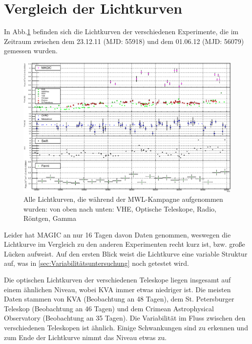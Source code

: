 \section{Vergleich der Lichtkurven}
In Abb.\ref{LC_MWL} befinden sich die Lichtkurven der verschiedenen Experimente, die im Zeitraum zwischen dem 23.12.11 (MJD: 55918) und dem 01.06.12 (MJD: 56079) gemessen wurden.

\begin{figure}
    \centering
    \includegraphics[width=1\linewidth]{./Plots/05_MWL/LC_final.pdf}
    \caption{Alle Lichtkurven, die während der MWL-Kampagne aufgenommen wurden: von oben nach unten: VHE, Optische Teleskope, Radio, Röntgen, Gamma}
    \label{LC_MWL}
\end{figure}

Leider hat MAGIC an nur 16 Tagen davon Daten genommen, weswegen die Lichtkurve im Vergleich zu den anderen Experimenten recht kurz ist, bzw. große Lücken aufweist.
Auf den ersten Blick weist die Lichtkurve eine variable Struktur auf, was in \autoref{sec:Variabilitätsuntersuchung} noch getestet wird.

Die optischen Lichtkurven der verschiedenen Teleskope liegen insgesamt auf einem ähnlichen Niveau, wobei KVA immer etwas niedriger ist.
Die meisten Daten stammen von KVA (Beobachtung an 48 Tagen), dem St. Petersburger Teleskop (Beobachtung an 46 Tagen) und dem Crimean Astrophysical Observatory (Beobachtung an 35 Tagen).
Die Variabilität im Fluss zwischen den verschiedenen Teleskopen ist ähnlich. 
Einige Schwankungen sind zu erkennen und zum Ende der Lichtkurve nimmt das Niveau etwas zu.

